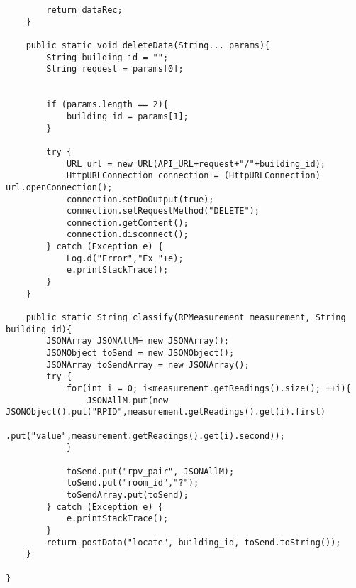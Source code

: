 \begin{lstlisting}
        return dataRec;
    }

    public static void deleteData(String... params){
        String building_id = "";
        String request = params[0];


        if (params.length == 2){
            building_id = params[1];
        }

        try {
            URL url = new URL(API_URL+request+"/"+building_id);
            HttpURLConnection connection = (HttpURLConnection) url.openConnection();
            connection.setDoOutput(true);
            connection.setRequestMethod("DELETE");
            connection.getContent();
            connection.disconnect();
        } catch (Exception e) {
            Log.d("Error","Ex "+e);
            e.printStackTrace();
        }
    }

    public static String classify(RPMeasurement measurement, String building_id){
        JSONArray JSONAllM= new JSONArray();
        JSONObject toSend = new JSONObject();
        JSONArray toSendArray = new JSONArray();
        try {
            for(int i = 0; i<measurement.getReadings().size(); ++i){
                JSONAllM.put(new JSONObject().put("RPID",measurement.getReadings().get(i).first)
                        .put("value",measurement.getReadings().get(i).second));
            }

            toSend.put("rpv_pair", JSONAllM);
            toSend.put("room_id","?");
            toSendArray.put(toSend);
        } catch (Exception e) {
            e.printStackTrace();
        }
        return postData("locate", building_id, toSend.toString());
    }

}
\end{lstlisting}
\newpage
